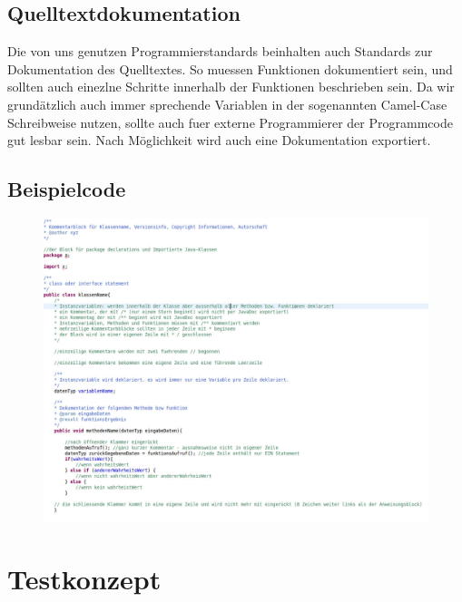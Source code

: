 \documentclass[11pt,a4paper]{article}
\begin{document}
\subsection{Quelltextdokumentation}

Die von uns genutzen Programmierstandards beinhalten auch Standards zur Dokumentation des Quelltextes. So muessen Funktionen dokumentiert sein, und sollten auch einezlne Schritte innerhalb der Funktionen beschrieben sein. Da wir grundätzlich auch immer sprechende Variablen in der sogenannten Camel-Case Schreibweise nutzen, sollte auch fuer externe Programmierer der Programmcode gut lesbar sein. Nach Möglichkeit wird auch eine Dokumentation exportiert.

\subsection{Beispielcode}

\begin{figure}[htb]
  \centering
  \includegraphics[scale=0.3]{Unbenannt.jpg}
  \label{PNFs}
\end{figure} 



\section{Testkonzept}
\end{document}
